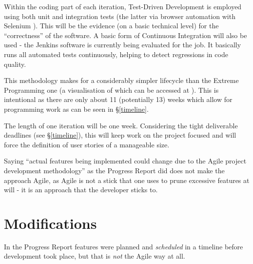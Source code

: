 Within the coding part of each iteration, Test-Driven Development is employed using both unit and integration tests (the latter via browser automation with Selenium \cite{selenium}). This will be the evidence (on a basic technical level) for the ``correctness'' of the software. A basic form of Continuous Integration \cite{ci} will also be used - the Jenkins \cite{jenkins} software is currently being evaluated for the job. It basically runs all automated tests continuously, helping to detect regressions in code quality.

This methodology makes for a considerably simpler lifecycle than the Extreme Programming one (a visualisation of which can be accessed at \cite{xp-lifecycle}). This is intentional as there are only about 11 (potentially 13) weeks which allow for programming work as can be seen in \S\ref{timeline}.

The length of one iteration will be one week. Considering the tight deliverable deadlines (see \S\ref{timeline}), this will keep work on the project focused and will force the definition of user stories of a manageable size.


Saying ``actual features being implemented could change due to the Agile project development methodology'' as the Progress Report did does not make the approach Agile, as Agile is not a stick that one uses to prune excessive features at will - it is an approach that the developer sticks to.

\section{Modifications}
In the Progress Report features were planned and \emph{scheduled} in a timeline before development took place, but that is \emph{not} the Agile way at all.

